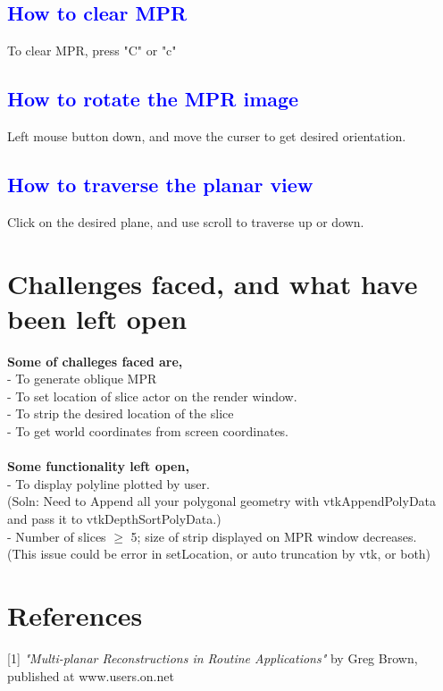 \documentclass[12pt]{report}
\begin{document}
\section{\textcolor{blue}{How to clear MPR} }
To clear MPR, press "C" or "c"

\section{\textcolor{blue}{How to rotate the MPR image} }
Left mouse button down, and move the curser to get desired orientation.

\section{\textcolor{blue}{How to traverse the planar view} }
Click on the desired plane, and use scroll to traverse up or down.


\chapter{Challenges faced, and what have been left open}

\textbf{Some of challeges faced are,}\\
- To generate oblique MPR  \\
- To set location of slice actor on the render window. \\
- To strip the desired location of the slice  \\
- To get world coordinates from screen coordinates.
\\
\\
\textbf{Some functionality left open,}\\
- To display polyline plotted by user. \\(Soln: Need to Append all your polygonal geometry with vtkAppendPolyData and pass it to vtkDepthSortPolyData.) \\
- Number of slices $\ge$ 5; size of strip displayed on MPR window decreases. \\
(This issue could be error in setLocation, or auto truncation by vtk, or both)\\



\chapter{References} 

[1] \textit{"Multi-planar Reconstructions in Routine Applications"} by Greg Brown, published at www.users.on.net 
\end{document}
